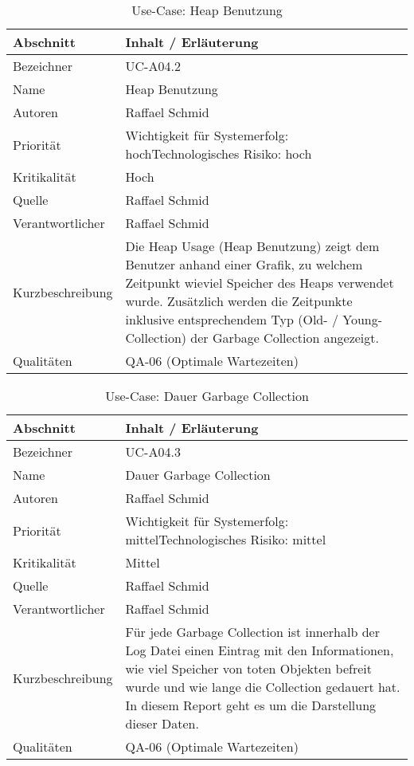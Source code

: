 \begin{longtable}{|p{4cm}|p{10.5cm}|}
\caption{Use-Case: Heap Benutzung}\\\hline
   \textbf{Abschnitt} & \textbf{Inhalt / Erläuterung} \\\hline
   Bezeichner & UC-A04.2\\\hline
   Name & Heap Benutzung\\\hline
   Autoren & Raffael Schmid\\\hline
   Priorität & Wichtigkeit für Systemerfolg: hoch\newline Technologisches Risiko: hoch\\\hline
   Kritikalität & Hoch\\\hline
   Quelle & Raffael Schmid\\\hline
   Verantwortlicher & Raffael Schmid\\\hline
   Kurzbeschreibung & Die Heap Usage (Heap Benutzung) zeigt dem Benutzer anhand einer Grafik, zu welchem Zeitpunkt wieviel Speicher des Heaps verwendet wurde. Zusätzlich werden die Zeitpunkte inklusive entsprechendem Typ (Old- / Young-Collection) der Garbage Collection angezeigt.  \\\hline
   Qualitäten & QA-06 (Optimale Wartezeiten)\\\hline
\end{longtable}

\begin{longtable}{|p{4cm}|p{10.5cm}|}
\caption{Use-Case: Dauer Garbage Collection}\\\hline
   \textbf{Abschnitt} & \textbf{Inhalt / Erläuterung} \\\hline
   Bezeichner & UC-A04.3\\\hline
   Name & Dauer Garbage Collection\\\hline
   Autoren & Raffael Schmid\\\hline
   Priorität & Wichtigkeit für Systemerfolg: mittel\newline Technologisches Risiko: mittel\\\hline
   Kritikalität & Mittel\\\hline
   Quelle & Raffael Schmid\\\hline
   Verantwortlicher & Raffael Schmid\\\hline
   Kurzbeschreibung & Für jede Garbage Collection ist innerhalb der Log Datei einen Eintrag mit den Informationen, wie viel Speicher von toten Objekten befreit wurde und wie lange die Collection gedauert hat. In diesem Report geht es um die Darstellung dieser Daten.\\\hline
   Qualitäten & QA-06 (Optimale Wartezeiten)\\\hline
\end{longtable}


